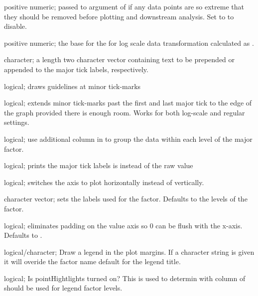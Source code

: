 \documentclass[a4paper]{book}
\begin{document}
\begin{Arguments}
\begin{ldescription}
\item[\code{trim}] positive numeric; passed to  argument of  if any data points are so extreme that they should be removed before plotting and downstream analysis. Set to  to disable.

\item[\code{logScale}] positive numeric; the base for the for log scale data transformation calculated as .

\item[\code{axisText}] character; a length two character vector containing text to be prepended or appended to the major tick labels, respectively.

\item[\code{minorGuides}] logical; draws guidelines at minor tick-marks

\item[\code{extendTicks}] logical; extends minor tick-marks past the first and last major tick to the edge of the graph provided there is enough room. Works for both log-scale and regular settings.

\item[\code{subGroup}] logical; use additional column in  to group the data within each level of the major factor.

\item[\code{expLabels}] logical; prints the major tick labels is  instead of the raw value

\item[\code{sidePlot}] logical; switches the axis to plot horizontally instead of vertically.

\item[\code{subGroupLabels}] character vector; sets the labels used for the  factor. Defaults to the levels of the factor.

\item[\code{strictLimits}] logical; eliminates padding on the value axis so 0 can be flush with the x-axis. Defaults to .

\item[\code{legend}] logical/character; Draw a legend in the plot margins. If a character string is given it will overide the factor name default for the legend title.

\item[\code{pointHighlights}] logical; Is pointHightlights turned on? This is used to determin with column of  should be used for legend factor levels.
\end{ldescription}
\end{Arguments}
\end{document}
